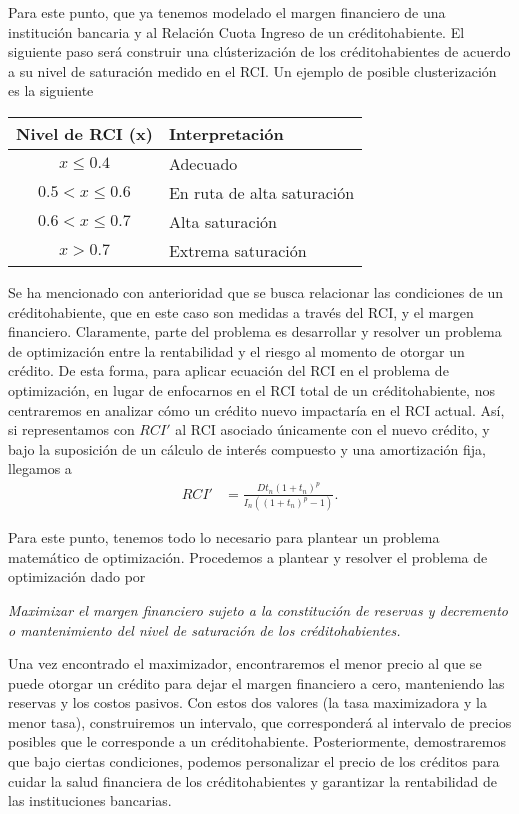 Para este punto, que ya tenemos modelado el margen financiero de una institución bancaria y al Relación Cuota Ingreso de un créditohabiente. El siguiente paso será construir una clústerización de los créditohabientes de acuerdo a su nivel de saturación medido en el RCI. Un ejemplo de posible clusterización es la siguiente
\begin{table}[H]
    \centering
    \begin{tabular}{|c|l|}
        \hline
        \textbf{Nivel de RCI (x)} & \textbf{Interpretación} \\
        \hline
        $x \leq 0.4$ & Adecuado \\
        $0.5 < x \leq 0.6$ & En ruta de alta saturación \\
        $0.6 < x \leq 0.7$ &  Alta saturación \\
        $x > 0.7$ & Extrema saturación \\
        \hline
    \end{tabular}
    \label{clusters rci}
\end{table}
\newpage
Se ha mencionado con anterioridad que se busca relacionar las condiciones de un créditohabiente, que en este caso son medidas a través del RCI, y el margen financiero. Claramente, parte del problema es desarrollar y resolver un problema de optimización entre la rentabilidad y el riesgo al momento de otorgar un crédito. De esta forma, para aplicar  ecuación del RCI en el problema de optimización, en lugar de enfocarnos en el RCI total de un créditohabiente, nos centraremos en analizar cómo un crédito nuevo impactaría en el RCI actual. Así, si representamos con $RCI'$ al RCI asociado únicamente con el nuevo crédito, y bajo la suposición de un cálculo de interés compuesto y una amortización fija, llegamos a
\begin{align*}
    RCI' &= \frac{Dt_n(1+t_n)^p}{I_n((1+t_n)^p-1)}.
\end{align*}

Para este punto, tenemos todo lo necesario para plantear un problema matemático de optimización. Procedemos a plantear y resolver el problema de optimización dado por
\begin{center}
    \textit{Maximizar el margen financiero sujeto a la constitución de reservas y decremento o mantenimiento del nivel de saturación de los créditohabientes.}
\end{center}
Una vez encontrado el maximizador, encontraremos el menor precio al que se puede otorgar un crédito para dejar el margen financiero a cero, manteniendo las reservas y los costos pasivos. Con estos dos valores (la tasa maximizadora y la menor tasa), construiremos un intervalo, que corresponderá al intervalo de precios posibles que le corresponde a un créditohabiente. Posteriormente, demostraremos que bajo ciertas condiciones, podemos personalizar el precio de los créditos para cuidar la salud financiera de los créditohabientes y garantizar la rentabilidad de las instituciones bancarias.

